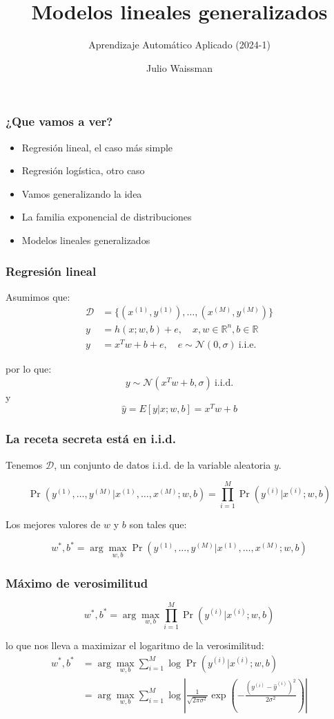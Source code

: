 \documentclass{beamer}
\title{Modelos lineales generalizados}
\author{Aprendizaje Automático Aplicado (2024-1)}
\date{Julio Waissman}
\begin{document}
\begin{frame}
  \titlepage
\end{frame}

\begin{frame}
  \frametitle{¿Que vamos a ver?}
  
\begin{itemize}
    \item  Regresión lineal, el caso más simple
    \item  Regresión logística, otro caso
    \item  Vamos generalizando la idea
    \item  La familia exponencial de distribuciones
    \item  Modelos lineales generalizados
\end{itemize}

\end{frame}

\begin{frame}
  \frametitle{Regresión lineal}

  Asumimos que:
  \begin{align*}
    \mathcal{D} &= \{(x^{(1)}, y^{(1)}), \ldots, (x^{(M)}, y^{(M)})\} \\
    y &= h(x; w, b) + e, \quad x, w \in \mathbb{R}^n, b \in  \mathbb{R} \\
    y &= x^T w + b + e, \quad e \sim \mathcal{N}(0, \sigma) \ \text{i.i.e.} 
    \end{align*}

    por lo que:
    $$
    y \sim \mathcal{N}(x^T w + b, \sigma) \ \text{i.i.d.}
    $$
    y 
    $$
    \hat{y} = E[y | x; w, b] = x^T w + b
    $$
\end{frame}

\begin{frame}
  \frametitle{La receta secreta está en i.i.d.}

  Tenemos $\mathcal{D}$, un conjunto de datos i.i.d. de la variable aleatoria $y$.

  $$
  \Pr(y^{(1)}, \ldots, y^{(M)} | x^{(1)}, \ldots, x^{(M)}; w, b) = \prod_{i=1}^M \Pr(y^{(i)} | x^{(i)}; w, b)
  $$

  Los mejores valores de $w$ y $b$ son tales que:

  $$
  w^*, b^* = \arg \max_{w, b} \Pr(y^{(1)}, \ldots, y^{(M)} | x^{(1)}, \ldots, x^{(M)}; w, b)
  $$

\end{frame}

\begin{frame}
  \frametitle{Máximo de verosimilitud}
  $$
  w^*, b^* = \arg \max_{w, b} \prod_{i=1}^M \Pr(y^{(i)} | x^{(i)}; w, b)
  $$

  lo que nos lleva a maximizar el logaritmo de la verosimilitud:
  \begin{align*}
    w^*, b^* &= \arg \max_{w, b} \sum_{i=1}^M \log \Pr(y^{(i)} | x^{(i)}; w, b) \\
    &= \arg \max_{w, b} \sum_{i=1}^M \log\left| \frac{1}{\sqrt{2 \pi \sigma^2}} \exp \left( - \frac{(y^{(i)} - \hat{y}^{(i)})^2}{2 \sigma^2} \right)\right|
  \end{align*}
\end{frame}
\end{document}

